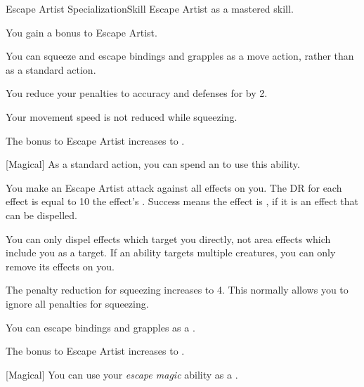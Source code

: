     \begin{feat}{Escape Artist Specialization}{Skill}
        \featpre Escape Artist as a mastered skill.
        \featben

         You gain a  bonus to Escape Artist.

         You can squeeze and escape bindings and grapples as a move action, rather than as a standard action.

         You reduce your penalties to accuracy and defenses for  by 2.

         Your movement speed is not reduced while squeezing.

         The bonus to Escape Artist increases to .

        [Magical] As a standard action, you can spend an  to use this ability.
        \begin{ability}
            \begin{spelleffects}
                \spelleffect You make an Escape Artist attack against all  effects on you.
                The DR for each effect is equal to 10 \add the effect's .
                Success means the effect is , if it is an effect that can be dispelled.
                \par You can only dispel effects which target you directly, not area effects which include you as a target.
                If an ability targets multiple creatures, you can only remove its effects on you.
            \end{spelleffects}
        \end{ability}

         The penalty reduction for squeezing increases to 4.
        This normally allows you to ignore all penalties for squeezing.

         You can escape bindings and grapples as a .

         The bonus to Escape Artist increases to .

        [Magical] You can use your \textit{escape magic} ability as a .
    \end{feat}

